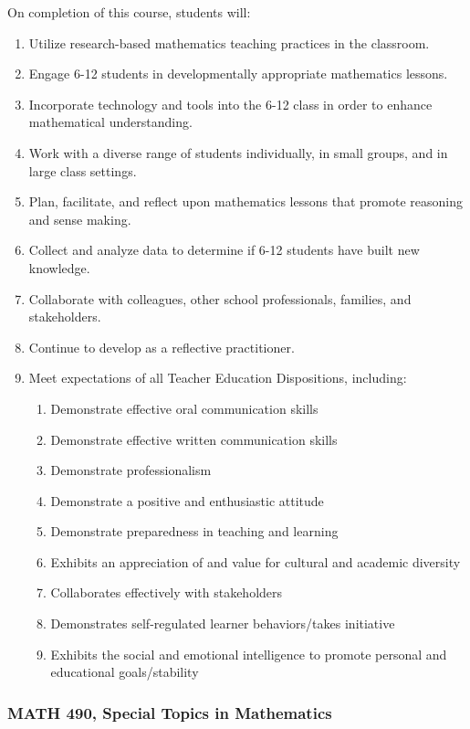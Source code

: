 \documentclass[11pt]{article}
\newenvironment{alphalist}{
\begin{enumerate}[label=(\arabic*),widest=107 ,leftmargin=25pt, itemsep=0pt]}
{\end{enumerate}}
\newenvironment{betalist}{
\begin{enumerate}[label=(\alph*),widest=zzz,leftmargin=25pt,itemsep=0pt]}
{\end{enumerate}}
\begin{document}
On completion of this course, students will:
\begin{alphalist}
\item Utilize research-based mathematics teaching practices in the classroom.
\item Engage 6-12 students in developmentally appropriate mathematics lessons.
\item Incorporate technology and tools into the 6-12 class in order to enhance mathematical understanding.
\item Work with a diverse range of students individually, in small groups, and in large class settings.
\item Plan, facilitate, and reflect upon mathematics lessons that promote reasoning and sense making.
\item Collect and analyze data to determine if 6-12 students have built new knowledge. 
\item Collaborate with colleagues, other school professionals, families, and stakeholders.
\item Continue to develop as a reflective practitioner.
\item Meet expectations of all Teacher Education Dispositions, including:
\begin{betalist}
\item Demonstrate effective oral communication skills
\item Demonstrate effective written communication skills
\item Demonstrate professionalism
\item Demonstrate a positive and enthusiastic attitude
\item Demonstrate preparedness in teaching and learning
\item Exhibits an appreciation of and value for cultural and academic diversity
\item Collaborates effectively with stakeholders
\item Demonstrates self-regulated learner behaviors/takes initiative
\item Exhibits the social and emotional intelligence to promote personal and educational goals/stability
\end{betalist}
\end{alphalist}

\subsubsection*{MATH 490, Special Topics in Mathematics}
\end{document}
